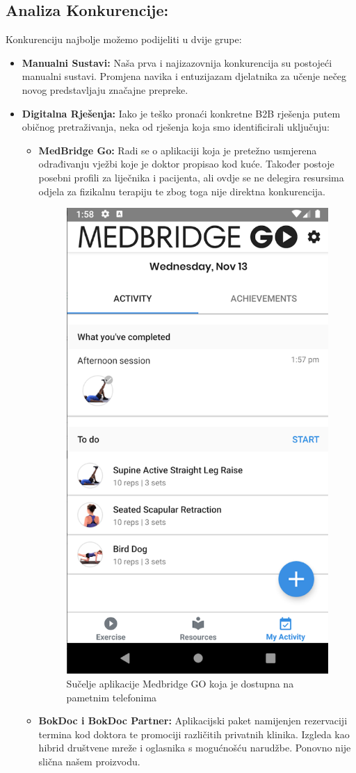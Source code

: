             \subsection*{Analiza Konkurencije:} 
                Konkurenciju najbolje možemo podijeliti u dvije grupe: 
                \begin{itemize}
                    \item \textbf{Manualni Sustavi:} Naša prva i najizazovnija konkurencija su postojeći manualni sustavi. Promjena navika i entuzijazam djelatnika za učenje nečeg novog predstavljaju značajne prepreke.
                    \item \textbf{Digitalna Rješenja:} Iako je teško pronaći konkretne B2B rješenja putem običnog pretraživanja, neka od rješenja koja smo identificirali uključuju:
                    \begin{itemize}
                        \item \textbf{MedBridge Go:} Radi se o aplikaciji koja je pretežno usmjerena odrađivanju vježbi koje je doktor propisao kod kuće. 
                        Također postoje posebni profili za liječnika i pacijenta, ali ovdje se ne delegira resursima odjela za fizikalnu terapiju te zbog toga nije direktna konkurencija. 
                        \begin{figure}[!h]
                            \centering
                            \includegraphics[width=0.35\linewidth]{slike/medbridge-go.png}
                            \caption{Sučelje aplikacije Medbridge GO koja je dostupna na pametnim telefonima}
                        \end{figure}
                        \item \textbf{BokDoc i BokDoc Partner:} Aplikacijski paket namijenjen rezervaciji termina kod doktora te promociji različitih privatnih klinika. Izgleda kao hibrid društvene mreže i oglasnika s mogućnošću narudžbe. Ponovno nije slična našem proizvodu. 

\end{itemize}
\end{itemize}
